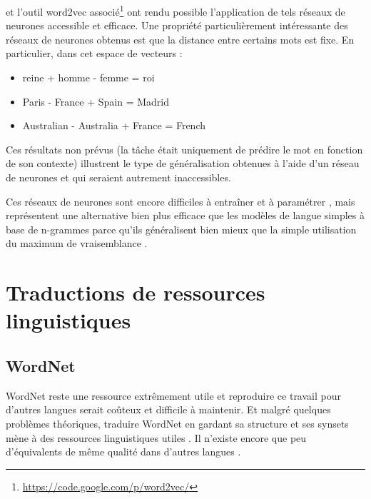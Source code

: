 
\cite{mikolov2013efficient} et l'outil word2vec
associé\footnote{\url{https://code.google.com/p/word2vec/}} ont rendu possible
l'application de tels réseaux de neurones accessible et efficace. Une propriété
particulièrement intéressante des réseaux de neurones obtenus est que la
distance entre certains mots est fixe. En particulier, dans cet espace de
vecteurs :

\begin{itemize}
    \item reine + homme - femme = roi
    \item Paris - France + Spain = Madrid
    \item Australian - Australia + France = French
\end{itemize}

Ces résultats non prévus (la tâche était uniquement de prédire le mot en
fonction de son contexte) illustrent le type de généralisation obtenues à
l'aide d'un réseau de neurones et qui seraient autrement inaccessibles.

Ces réseaux de neurones sont encore difficiles à entraîner et à paramétrer
\citep{do2014modeles}, mais représentent une alternative bien plus efficace que
les modèles de langue simples à base de n-grammes parce qu'ils généralisent
bien mieux que la simple utilisation du maximum de vraisemblance
\citep{olah2014deep}.


\section{Traductions de ressources linguistiques}
\label{sec:translation}

\subsection{WordNet}

WordNet reste une ressource extrêmement utile et reproduire ce travail pour
d'autres langues serait coûteux et difficile à maintenir. Et malgré quelques
problèmes théoriques, traduire WordNet en gardant sa structure et ses synsets
mène à des ressources linguistiques utiles
\citep{fellbaum2007connecting,demelo2008utility}. Il n'existe encore que peu
d'équivalents de même qualité dans d'autres langues \citep{bond2012survey}.

